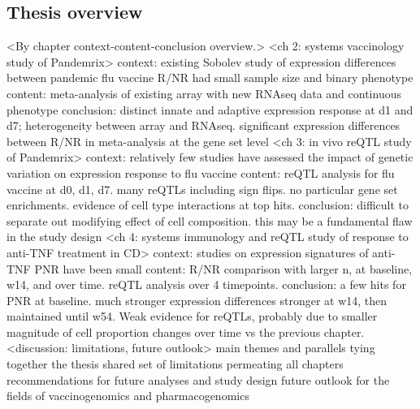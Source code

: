 \begin{outline}
\section{Thesis overview}

\1 <By chapter context-content-conclusion overview.>
    \2 <ch 2: systems vaccinology study of Pandemrix>
        \3 context: existing Sobolev study of expression differences between pandemic flu vaccine R/NR had small sample size and binary phenotype
        \3 content: meta-analysis of existing array with new RNAseq data and continuous phenotype
        \3 conclusion: distinct innate and adaptive expression response at d1 and d7; heterogeneity between array and RNAseq. significant expression differences between R/NR in meta-analysis at the gene set level
    \2 <ch 3: in vivo reQTL study of Pandemrix>
        \3 context: relatively few studies have assessed the impact of genetic variation on expression response to flu vaccine
        \3 content: reQTL analysis for flu vaccine at d0, d1, d7. many reQTLs including sign flips. no particular gene set enrichments. evidence of cell type interactions at top hits.
        \3 conclusion: difficult to separate out modifying effect of cell composition. this may be a fundamental flaw in the study design
    \2 <ch 4: systems immunology and reQTL study of response to anti-TNF treatment in CD>
        \3 context: studies on expression signatures of anti-TNF PNR have been small
        \3 content: R/NR comparison with larger n, at baseline, w14, and over time. reQTL analysis over 4 timepoints. 
        \3 conclusion: a few hits for PNR at baseline. much stronger expression differences stronger at w14, then maintained until w54. Weak evidence for reQTLs, probably due to smaller magnitude of cell proportion changes over time vs the previous chapter.
    \2 <discussion: limitations, future outlook>
        \3 main themes and parallels tying together the thesis
        \3 shared set of limitations permeating all chapters
        \3 recommendations for future analyses and study design
        \3 future outlook for the fields of vaccinogenomics and pharmacogenomics

\end{outline}

